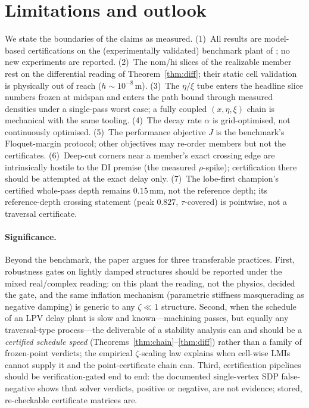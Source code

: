 \documentclass[preprint,12pt]{elsarticle}
\begin{document}
\clearpage
\section{Limitations and outlook}

We state the boundaries of the claims as measured.  (1)~All results are
model-based certifications on the (experimentally validated) benchmark
plant of \cite{Du2024}; no new experiments are reported.  (2)~The
nom/hi slices of the realizable member rest on the differential
reading of Theorem~\ref{thm:diff}; their static cell validation is
physically out of reach ($h \sim 10^{-8}$\,m).  (3)~The
$\eta/\xi$ tube enters the headline slice numbers frozen at midspan
and enters the path bound through measured densities under a
single-pass worst case; a fully coupled $(x, \eta, \xi)$ chain is
mechanical with the same tooling.  (4)~The decay rate $\alpha$ is
grid-optimised, not continuously optimised.  (5)~The performance
objective $J$ is the benchmark's Floquet-margin protocol; other
objectives may re-order members but not the certificates.
(6)~Deep-cut corners near a member's exact crossing edge are
intrinsically hostile to the DI premise (the measured $\rho$-spike);
certification there should be attempted at the exact delay only.
(7)~The lobe-first champion's certified whole-pass depth remains
$0.15$\,mm, not the reference depth; its reference-depth crossing
statement (peak $0.827$, $\tau$-covered) is pointwise, not a
traversal certificate.

\paragraph{Significance.}
Beyond the benchmark, the paper argues for three transferable
practices.  First, robustness gates on lightly damped structures
should be reported under the mixed real/complex reading: on this
plant the reading, not the physics, decided the gate, and the same
inflation mechanism (parametric stiffness masquerading as negative
damping) is generic to any $\zeta \ll 1$ structure.  Second, when the
schedule of an LPV delay plant is slow and known---machining passes,
but equally any traversal-type process---the deliverable of a
stability analysis can and should be a \emph{certified schedule
speed} (Theorems~\ref{thm:chain}--\ref{thm:diff}) rather than a
family of frozen-point verdicts; the empirical $\zeta$-scaling law
explains when cell-wise LMIs cannot supply it and the
point-certificate chain can.  Third, certification pipelines should
be verification-gated end to end: the documented single-vertex SDP
false-negative shows that solver verdicts, positive or negative, are
not evidence; stored, re-checkable certificate matrices are.
\end{document}
